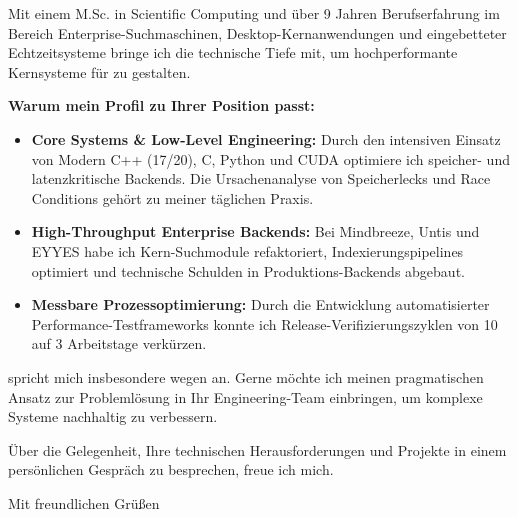 \documentclass[11pt,a4paper]{article}
\begin{document}
Mit einem M.Sc. in Scientific Computing und über 9 Jahren Berufserfahrung im Bereich Enterprise-Suchmaschinen, Desktop-Kernanwendungen und eingebetteter Echtzeitsysteme bringe ich die technische Tiefe mit, um hochperformante Kernsysteme für \textbf{\firmenName} zu gestalten.

\textbf{Warum mein Profil zu Ihrer Position passt:}

\begin{itemize}[leftmargin=1.2em, itemsep=0.15em, parsep=0pt, topsep=0.2em]
    \item \textbf{Core Systems \& Low-Level Engineering:} Durch den intensiven Einsatz von Modern C++ (17/20), C, Python und CUDA optimiere ich speicher- und latenzkritische Backends. Die Ursachenanalyse von Speicherlecks und Race Conditions gehört zu meiner täglichen Praxis.
    \item \textbf{High-Throughput Enterprise Backends:} Bei Mindbreeze, Untis und EYYES habe ich Kern-Suchmodule refaktoriert, Indexierungspipelines optimiert und technische Schulden in Produktions-Backends abgebaut.
    \item \textbf{Messbare Prozessoptimierung:} Durch die Entwicklung automatisierter Performance-Testframeworks konnte ich Release-Verifizierungszyklen von 10 auf 3 Arbeitstage verkürzen.
\end{itemize}

\firmenFlussbezug spricht mich insbesondere wegen \textit{\firmenHighlight} an. Gerne möchte ich meinen pragmatischen Ansatz zur Problemlösung in Ihr Engineering-Team einbringen, um komplexe Systeme nachhaltig zu verbessern.

Über die Gelegenheit, Ihre technischen Herausforderungen und Projekte in einem persönlichen Gespräch zu besprechen, freue ich mich.

\vspace{0.6em}

Mit freundlichen Grüßen

\vspace{1.2em}

\textbf{\meinName}
\end{document}
